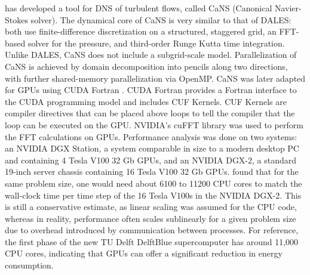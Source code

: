\citet{costaFFTbasedFinitedifferenceSolver2018} has developed a tool for DNS of turbulent flows, called CaNS (Canonical Navier-Stokes solver). The dynamical core of CaNS is very similar to that of DALES: both use finite-difference discretization on a structured, staggered grid, an FFT-based solver for the pressure, and third-order Runge Kutta time integration. Unlike DALES, CaNS does not include a subgrid-scale model. Parallelization of CaNS is achieved by domain decomposition into pencils along two directions, with further shared-memory parallelization via OpenMP.
CaNS was later adapted for GPUs using CUDA Fortran \citep{costaGPUAccelerationCaNS2021}. CUDA Fortran provides a Fortran interface to the CUDA programming model and includes CUF Kernels. CUF Kernels are compiler directives that can be placed above loops to tell the compiler that the loop can be executed on the GPU. NVIDIA's cuFFT library was used to perform the FFT calculations on GPUs. Performance analysis was done on two systems: an NVIDIA DGX Station, a system comparable in size to a modern desktop PC and containing 4 Tesla V100 32 Gb GPUs, and an NVIDIA DGX-2, a standard 19-inch server chassis containing 16 Tesla V100 32 Gb GPUs. \citet{costaGPUAccelerationCaNS2021} found that for the same problem size, one would need about 6100 to 11200 CPU cores to match the wall-clock time per time step of the 16 Tesla V100s in the NVIDIA DGX-2. This is still a conservative estimate, as linear scaling was assumed for the CPU code, whereas in reality, performance often scales sublinearly for a given problem size due to overhead introduced by communication between processes. For reference, the first phase of the new TU Delft DelftBlue supercomputer has around 11,000 CPU cores, indicating that GPUs can offer a significant reduction in energy consumption.
